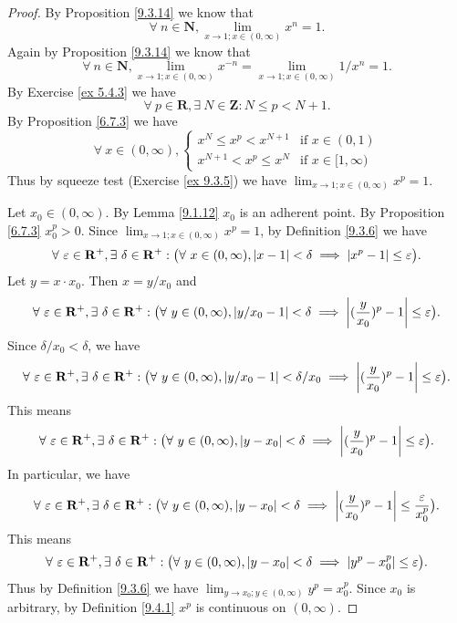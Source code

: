 \begin{proof}
    By Proposition \ref{9.3.14} we know that
    \[
        \forall\ n \in \mathbf{N}, \lim_{x \to 1 ; x \in (0, \infty)} x^n = 1.
    \]
    Again by Proposition \ref{9.3.14} we know that
    \[
        \forall\ n \in \mathbf{N}, \lim_{x \to 1 ; x \in (0, \infty)} x^{-n} = \lim_{x \to 1 ; x \in (0, \infty)} 1 / x^n = 1.
    \]
    By Exercise \ref{ex 5.4.3} we have
    \[
        \forall\ p \in \mathbf{R}, \exists\ N \in \mathbf{Z} : N \leq p < N + 1.
    \]
    By Proposition \ref{6.7.3} we have
    \[
        \forall\ x \in (0, \infty), \begin{cases}
            x^N \leq x^p < x^{N + 1}   & \text{if } x \in (0, 1)      \\
            x^{N + 1} < x^p \leq x^{N} & \text{if } x \in [1, \infty)
        \end{cases}
    \]
    Thus by squeeze test (Exercise \ref{ex 9.3.5}) we have \(\lim_{x \to 1 ; x \in (0, \infty)} x^p = 1\).

    Let \(x_0 \in (0, \infty)\).
    By Lemma \ref{9.1.12} \(x_0\) is an adherent point.
    By Proposition \ref{6.7.3} \(x_0^p > 0\).
    Since \(\lim_{x \to 1 ; x \in (0, \infty)} x^p = 1\), by Definition \ref{9.3.6} we have
    \[
        \forall\ \varepsilon \in \mathbf{R}^+, \exists\ \delta \in \mathbf{R}^+ : \big(\forall\ x \in (0, \infty), \abs*{x - 1} < \delta \implies \abs*{x^p - 1} \leq \varepsilon\big).
    \]
    Let \(y = x \cdot x_0\).
    Then \(x = y / x_0\) and
    \[
        \forall\ \varepsilon \in \mathbf{R}^+, \exists\ \delta \in \mathbf{R}^+ : \big(\forall\ y \in (0, \infty), \abs*{y / x_0 - 1} < \delta \implies \abs*{(\frac{y}{x_0})^p - 1} \leq \varepsilon\big).
    \]
    Since \(\delta / x_0 < \delta\), we have
    \[
        \forall\ \varepsilon \in \mathbf{R}^+, \exists\ \delta \in \mathbf{R}^+ : \big(\forall\ y \in (0, \infty), \abs*{y / x_0 - 1} < \delta / x_0 \implies \abs*{(\frac{y}{x_0})^p - 1} \leq \varepsilon\big).
    \]
    This means
    \[
        \forall\ \varepsilon \in \mathbf{R}^+, \exists\ \delta \in \mathbf{R}^+ : \big(\forall\ y \in (0, \infty), \abs*{y - x_0} < \delta \implies \abs*{(\frac{y}{x_0})^p - 1} \leq \varepsilon\big).
    \]
    In particular, we have
    \[
        \forall\ \varepsilon \in \mathbf{R}^+, \exists\ \delta \in \mathbf{R}^+ : \big(\forall\ y \in (0, \infty), \abs*{y - x_0} < \delta \implies \abs*{(\frac{y}{x_0})^p - 1} \leq \frac{\varepsilon}{x_0^p}\big).
    \]
    This means
    \[
        \forall\ \varepsilon \in \mathbf{R}^+, \exists\ \delta \in \mathbf{R}^+ : \big(\forall\ y \in (0, \infty), \abs*{y - x_0} < \delta \implies \abs*{y^p - x_0^p} \leq \varepsilon\big).
    \]
    Thus by Definition \ref{9.3.6} we have \(\lim_{y \to x_0 ; y \in (0, \infty)} y^p = x_0^p\).
    Since \(x_0\) is arbitrary, by Definition \ref{9.4.1} \(x^p\) is continuous on \((0, \infty)\).
\end{proof}

